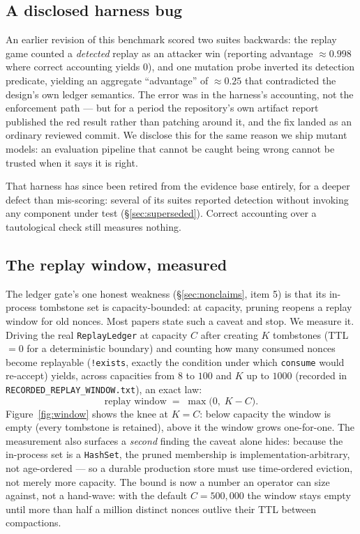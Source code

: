 \documentclass[10pt,twocolumn,letterpaper]{article}
\begin{document}
\subsection{A disclosed harness bug}
\label{sec:eval-bug}

An earlier revision of this benchmark scored two suites backwards: the
replay game counted a \emph{detected} replay as an attacker win (reporting
advantage $\approx 0.998$ where correct accounting yields 0), and one
mutation probe inverted its detection predicate, yielding an aggregate
``advantage'' of $\approx 0.25$ that contradicted the design's own ledger
semantics. The error was in the harness's accounting, not the enforcement
path --- but for a period the repository's own artifact report published the
red result rather than patching around it, and the fix landed as an ordinary
reviewed commit. We disclose this for the same reason we ship mutant models:
an evaluation pipeline that cannot be caught being wrong cannot be trusted
when it says it is right.

That harness has since been retired from the evidence base entirely, for a
deeper defect than mis-scoring: several of its suites reported detection
without invoking any component under test (\S\ref{sec:superseded}). Correct
accounting over a tautological check still measures nothing.

\subsection{The replay window, measured}
\label{sec:replaywindow}

The ledger gate's one honest weakness (\S\ref{sec:nonclaims}, item 5) is that
its in-process tombstone set is capacity-bounded: at capacity, pruning
reopens a replay window for old nonces. Most papers state such a caveat and
stop. We measure it. Driving the real \texttt{ReplayLedger} at capacity $C$
after creating $K$ tombstones (TTL$=0$ for a deterministic boundary) and
counting how many consumed nonces become replayable (\texttt{!exists}, exactly
the condition under which \texttt{consume} would re-accept) yields, across
capacities from $8$ to $100$ and $K$ up to $1000$ (recorded in
\texttt{RECORDED\_REPLAY\_WINDOW.txt}), an exact law:
\begin{equation}
\text{replay window} \;=\; \max\!\big(0,\; K - C\big).
\label{eq:window}
\end{equation}
Figure~\ref{fig:window} shows the knee at $K{=}C$: below capacity the window
is empty (every tombstone is retained), above it the window grows one-for-one.
The measurement also surfaces a \emph{second} finding the caveat alone hides:
because the in-process set is a \texttt{HashSet}, the pruned membership is
implementation-arbitrary, not age-ordered --- so a durable production store
must use time-ordered eviction, not merely more capacity. The bound is now a
number an operator can size against, not a hand-wave: with the default
$C{=}500{,}000$ the window stays empty until more than half a million distinct
nonces outlive their TTL between compactions.
\end{document}
